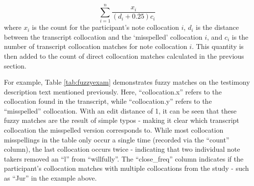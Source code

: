 \documentclass[print]{nuthesis}
\begin{document}
\[
\sum_{i=1}^n\frac{x_i}{(d_i+0.25)c_i}
\]
where \(x_i\) is the count for the participant's note collocation \(i\), \(d_i\) is the distance between the transcript collocation and the `misspelled' collocation \(i\), and \(c_i\) is the number of transcript collocation matches for note collocation \(i\).
This quantity is then added to the count of direct collocation matches calculated in the previous section.

For example, Table \ref{tab:fuzzyexam} demonstrates fuzzy matches on the testimony description text mentioned previously.
Here, ``collocation.x'' refers to the collocation found in the transcript, while ``collocation.y'' refers to the ``misspelled'' collocation.
With an edit distance of 1, it can be seen that these fuzzy matches are the result of simple typos - making it clear which transcript collocation the misspelled version corresponds to.
While most collocation misspellings in the table only occur a single time (recorded via the ``count'' column), the last collocation occurs twice - indicating that two individual note takers removed an ``l'' from ``willfully''.
The ``close\_freq'' column indicates if the participant's collocation matches with multiple collocations from the study - such as ``Jur'' in the example above.
\end{document}
